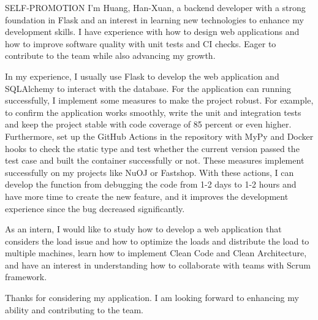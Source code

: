 \documentclass{resume} %
\begin{document}
\begin{rSection}{SELF-PROMOTION}
    I'm Huang, Han-Xuan, a backend developer with a strong foundation in Flask and an interest in learning new technologies to enhance my development skills. I have experience with how to design web applications and how to improve software quality with unit tests and CI checks. Eager to contribute to the team while also advancing my growth.

    In my experience, I usually use Flask to develop the web application and SQLAlchemy to interact with the database. For the application can running successfully, I implement some measures to make the project robust. For example, to confirm the application works smoothly, write the unit and integration tests and keep the project stable with code coverage of 85 percent or even higher. Furthermore, set up the GitHub Actions in the repository with MyPy and Docker hooks to check the static type and test whether the current version passed the test case and built the container successfully or not. 
    These measures implement successfully on my projects like NuOJ or Fastshop. With these actions, I can develop the function from debugging the code from 1-2 days to 1-2 hours and have more time to create the new feature, and it improves the development experience since the bug decreased significantly.

    As an intern, I would like to study how to develop a web application that considers the load issue and how to optimize the loads and distribute the load to multiple machines, learn how to implement Clean Code and Clean Architecture, and have an interest in understanding how to collaborate with teams with Scrum framework.

    Thanks for considering my application. I am looking forward to enhancing my ability and contributing to the team.
\end{rSection}
\end{document}
